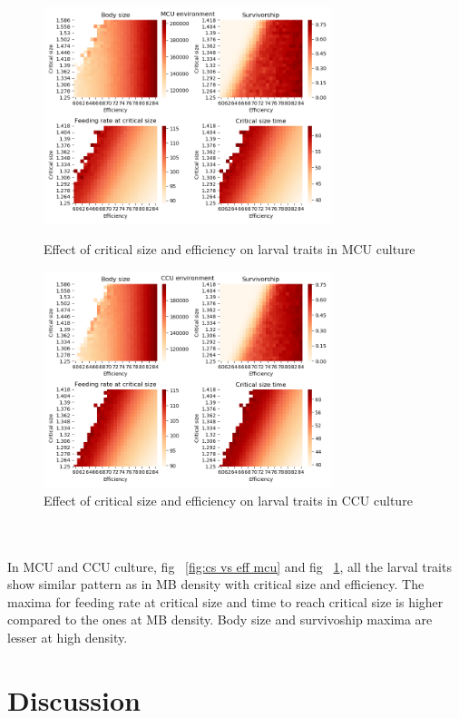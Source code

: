 \begin{figure}[!tbp]
  \centering
  \includegraphics[width=0.75\textwidth]{C3/Figs/Critical_size_vs_Efficiency_MCU}
  \caption{Effect of critical size and efficiency on larval traits in MCU culture}
  \label{fig:cs vs eff mcu}
  \vspace{24pt}
  \includegraphics[width=0.75\textwidth]{C3/Figs/Critical_size_vs_Efficiency_CCU}
  \caption{Effect of critical size and efficiency on larval traits in CCU culture}
  \label{fig:cs vs eff ccu}
\end{figure}\\\\
In MCU and CCU culture, fig ~\ref{fig:cs vs eff mcu} and fig ~\ref{fig:cs vs eff ccu}, all the larval traits show similar pattern as in MB density with critical size and efficiency. The maxima for feeding rate at critical size and time to reach critical size is higher compared to the ones at MB density. Body size and survivoship maxima are lesser at high density.
\section{Discussion}
\pagebreak


